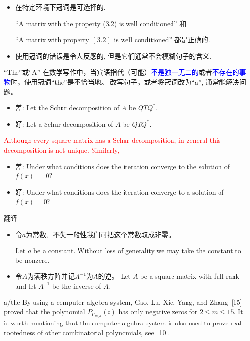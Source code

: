 \documentclass{ctexbeamer}
\newcommand{\red}[1]{\textcolor{red}{#1}}
\newcommand{\blue}[1]{\textcolor{blue}{#1}}
\begin{document}
\begin{frame}
\begin{itemize}
	\item 在特定环境下冠词是可选择的.

``A matrix with the property (3.2) is well conditioned''
和

 ``A matrix with property $(3.2)$ is well conditioned''
都是正确的.

 \item 使用冠词的错误是令人反感的, 但是它们通常不会模糊句子的含义.
\end{itemize}

\end{frame}


\begin{frame}{``The''或``A''}
在数学写作中，当宾语指代（可能）\blue{不是独一无二的}或者\blue{不存在的事物}时，使用冠词``the''是不恰当地。
改写句子，或者将冠词改为``a'', 通常能解决问题。
{

\begin{itemize}
\item 差: Let the Schur decomposition of $A$ be $Q T Q^{*}$.
\item 好: Let a Schur decomposition of $A$ be $Q T Q^{*}$.
	\end{itemize}
}

\pause
\red{
Although every square matrix has a Schur decomposition, in general this decomposition is not unique.  Similarly, }


\begin{itemize}
\item 差: Under what conditions does the iteration converge to the solution of $f(x)=$
$0 ?$  \pause

\item  好: Under what conditions does the iteration converge to a solution of $f(x)=0 ?$
\end{itemize}
\end{frame}

\begin{frame}{翻译}
\begin{itemize}
\item
    令$a$为常数。不失一般性我们可把这个常数取成非零。
\pause

Let $a$ be \alert{a} constant. Without loss of generality we may take \alert{the} constant to be nonzero.
\item
    令$A$为满秩方阵并记$A^{-1}$为$A$的逆。
    \pause
Let $A$ be \alert{a} square matrix with full rank and let $A^{-1}$ be \alert{the} inverse of $A$.
\end{itemize}
\end{frame}

\begin{frame}{a/the}
By using \alert{a}  computer algebra system,  Gao,   Lu,  Xie,  Yang, and  Zhang~[15] proved that the polynomial  $P_{U_{m,d}}(t)$ has only negative zeros for $2\leq m\leq 15$.
It is worth mentioning {that \alert{the} computer algebra system} is also used  to  prove  real-rootedness of  other combinatorial polynomials, see~[10].
\end{frame}
\end{document}
